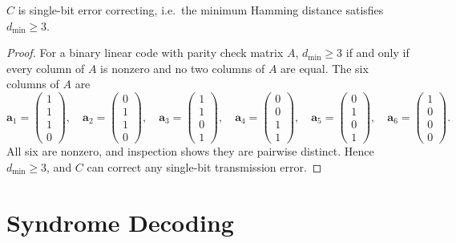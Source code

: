 \begin{proposition}
$C$ is single-bit error correcting, i.e.\ the minimum Hamming distance satisfies
$d_{\min} \geq 3$.
\end{proposition}

\begin{proof}
For a binary linear code with parity check matrix $A$, $d_{\min} \geq 3$ if and
only if every column of $A$ is nonzero and no two columns of $A$ are equal.
The six columns of $A$ are
\[
    \mathbf{a}_1 = \begin{pmatrix}1\\1\\1\\0\end{pmatrix},\quad
    \mathbf{a}_2 = \begin{pmatrix}0\\1\\1\\0\end{pmatrix},\quad
    \mathbf{a}_3 = \begin{pmatrix}1\\1\\0\\1\end{pmatrix},\quad
    \mathbf{a}_4 = \begin{pmatrix}0\\0\\1\\1\end{pmatrix},\quad
    \mathbf{a}_5 = \begin{pmatrix}0\\1\\0\\1\end{pmatrix},\quad
    \mathbf{a}_6 = \begin{pmatrix}1\\0\\0\\0\end{pmatrix}.
\]
All six are nonzero, and inspection shows they are pairwise distinct. Hence
$d_{\min} \geq 3$, and $C$ can correct any single-bit transmission error.
\end{proof}

\section{Syndrome Decoding}

